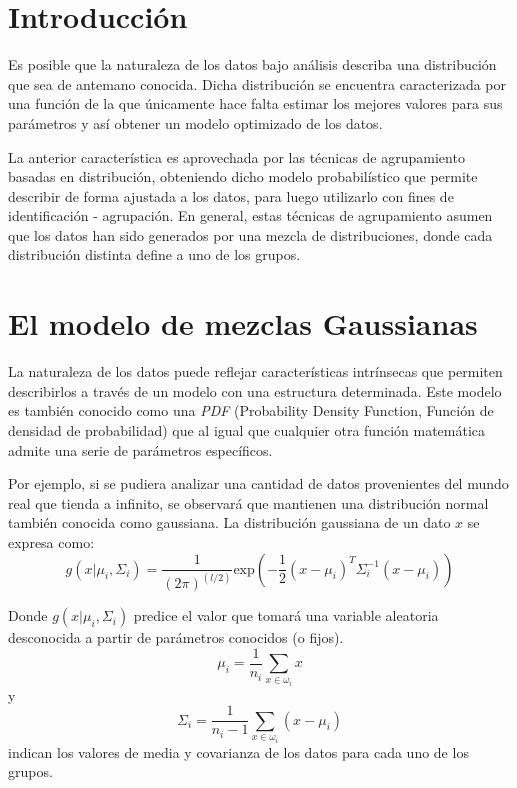 \documentclass[a4paper]{article}
\begin{document}
\section{Introducción} %
\label{sec:introducción}
Es posible que la naturaleza de los datos bajo análisis describa una distribución que sea de antemano conocida.
Dicha distribución se encuentra caracterizada por una función de la que únicamente hace falta estimar los mejores valores para sus parámetros y así obtener un modelo optimizado de los datos.

La anterior característica es aprovechada por las técnicas de agrupamiento basadas en distribución, obteniendo dicho modelo probabilístico que permite describir de forma ajustada a los datos, para luego utilizarlo con fines de identificación - agrupación.
En general, estas técnicas de agrupamiento asumen que los datos han sido generados por una mezcla de distribuciones, donde cada distribución distinta define a uno de los grupos.


\section{El modelo de mezclas Gaussianas} %
\label{sec:marco_teórico}
La naturaleza de los datos puede reflejar características intrínsecas que permiten describirlos a través de un modelo con una estructura determinada.
Este modelo es también conocido como una \emph{PDF} (Probability Density Function, Función de densidad de probabilidad) que al igual que cualquier otra función matemática admite una serie de parámetros específicos.

Por ejemplo, si se pudiera analizar una cantidad de datos provenientes del mundo real que tienda a infinito, se observará que mantienen una distribución normal también conocida como gaussiana.
La distribución gaussiana de un dato $x$ se expresa como:
\begin{equation}
g(x|\mu _i,\Sigma_i)  = \frac{1}{(2 \pi)^{(l/2)}}\text{exp} \left(  -\frac{1}{2}(x-\mu _i)^T \Sigma _i^{-1} (x-\mu _i) \right)
\end{equation}

Donde $g(x|\mu _i,\Sigma_i)$ predice el valor que tomará una variable aleatoria desconocida a partir de parámetros conocidos (o fijos).
$$\mu _i = \frac{1}{n_i} \sum_{x \in \omega _i}x$$ y $$\Sigma _i = \frac{1}{n_i - 1} \sum_{x \in \omega _i}(x - \mu _i)$$ indican los valores de media y covarianza de los datos para cada uno de los grupos.
\end{document}
